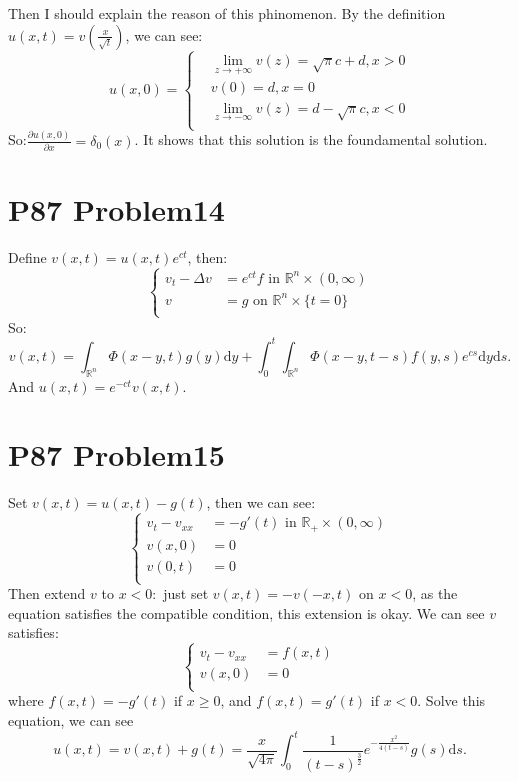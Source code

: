 \documentclass[a4paper]{ctexart}
\newcommand{\dif}{\mathrm{d}}
\newcommand{\pdfFrac}[2]{\frac{\partial #1}{\partial #2}}
\begin{document}
Then I should explain the reason of this phinomenon. By the definition $u(x,t)=v(\frac{x}{\sqrt{t}})$, we can see:
\begin{equation}
    u(x,0)=
    \left\{
        \begin{aligned}
           &\lim_{z\rightarrow+\infty}v(z)=\sqrt{\pi}c+d,x>0\\
           &v(0)=d,x=0\\
           &\lim_{z\rightarrow-\infty}v(z)=d-\sqrt{\pi}c,x<0\\
        \end{aligned}
    \right.
\end{equation}
So:$\pdfFrac{u(x,0)}{x}=\delta_{0}(x)$. It shows that this solution is the foundamental solution.

\section*{P87 Problem14}
Define $v(x,t)=u(x,t)e^{ct}$, then:
\begin{equation}
    \left\{
        \begin{aligned}
            v_{t}-\Delta v&=e^{ct}f\text{ in }\mathbb{R}^{n}\times(0,\infty)\\
            v&=g\text{ on }\mathbb{R}^{n}\times\{t=0\}\\
        \end{aligned}
    \right.
\end{equation}
So:
\begin{equation}
    v(x,t)=\int_{\mathbb{R}^{n}}\Phi(x-y,t)g(y)\dif y+\int_{0}^{t}\int_{\mathbb{R}^{n}}\Phi(x-y,t-s)f(y,s)e^{cs}\dif y\dif s.
\end{equation}
And $u(x,t)=e^{-ct}v(x,t)$.
\section*{P87 Problem15}
Set $v(x,t)=u(x,t)-g(t)$, then we can see:
\begin{equation}
    \left\{
        \begin{aligned}
            v_{t}-v_{xx}&=-g'(t)\text{ in }\mathbb{R}_{+}\times(0,\infty)\\
            v(x,0)&=0\\
            v(0,t)&=0\\
        \end{aligned}
    \right.
\end{equation}
Then extend $v$ to $x<0:$ just set $v(x,t)=-v(-x,t)$ on $x<0$, as the equation satisfies the  compatible condition, this extension is okay. We can see $v$ satisfies:
\begin{equation}
    \left\{
        \begin{aligned}
            v_{t}-v_{xx}&=f(x,t)\\
            v(x,0)&=0\\
        \end{aligned}
    \right.
\end{equation}
where $f(x,t)=-g'(t)$ if $x\ge 0$, and $f(x,t)=g'(t)$ if $x<0$. Solve this equation, we can see
\begin{equation}
    u(x,t)=v(x,t)+g(t)=\frac{x}{\sqrt{4\pi}}\int_{0}^{t}\frac{1}{(t-s)^{\frac{3}{2}}}e^{-\frac{x^{2}}{4(t-s)}}g(s)\dif s.
\end{equation}
\end{document}
